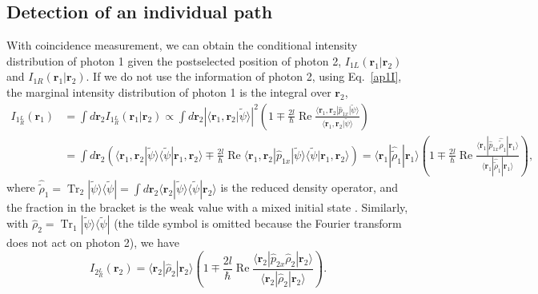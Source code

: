 \documentclass[pra,english,reprint,nofootinbib,aps,superscriptaddress,showpacs,showkeys]{revtex4-2}
\theoremstyle{definition}
\theoremstyle{remark}
\begin{document}
\begin{widetext}
		\section{Detection of an individual path}\label{appD}
		
		With coincidence measurement, we can obtain the conditional intensity distribution of photon 1 given the postselected position of photon 2, $I_{1L}(\mathbf{r}_1|\mathbf{r}_2)$ and $I_{1R}(\mathbf{r}_1|\mathbf{r}_2)$. If we do not use the information of photon 2, using Eq.~\eqref{ap1I}, the marginal intensity distribution of photon 1 is the integral over $\mathbf{r}_2$,
		\begin{align}
			I_{1{^L_R}}(\mathbf{r}_1)&=\int d\mathbf{r}_2 I_{1{^L_R}}(\mathbf{r}_1|\mathbf{r}_2)\propto\int d\mathbf{r}_2 \left|\langle\mathbf{r}_1,\mathbf{r}_2|\tilde{\psi}\rangle\right|^2\left(1\mp\frac{2l}{\hbar}\operatorname{Re}\frac{\langle\mathbf{r}_1,\mathbf{r}_2|\hat{p}_{1x}|\tilde{\psi}\rangle}{\langle\mathbf{r}_1,\mathbf{r}_2|\tilde{\psi}\rangle}\right)\nonumber\\
			&=\int d\mathbf{r}_2 \left(\langle\mathbf{r}_1,\mathbf{r}_2|\tilde{\psi}\rangle\langle\tilde{\psi}|\mathbf{r}_1,\mathbf{r}_2\rangle\mp\frac{2l}{\hbar}\operatorname{Re}\langle\mathbf{r}_1,\mathbf{r}_2|\hat{p}_{1x}|\tilde{\psi}\rangle\langle\tilde{\psi}|\mathbf{r}_1,\mathbf{r}_2\rangle\right)=\langle\mathbf{r}_1|\hat{\tilde{\rho}}_1|\mathbf{r}_1\rangle\left(1\mp\frac{2l}{\hbar}\operatorname{Re}\frac{\langle\mathbf{r}_1|\hat{p}_{1x}\hat{\tilde{\rho}}_1|\mathbf{r}_1\rangle}{\langle\mathbf{r}_1|\hat{\tilde{\rho}}_1|\mathbf{r}_1\rangle}\right),
		\end{align}
		where $\hat{\tilde{\rho}}_1=\operatorname{Tr}_2|\tilde{\psi}\rangle\langle\tilde{\psi}|=\int d\mathbf{r}_2\langle\mathbf{r}_2|\tilde{\psi}\rangle\langle\tilde{\psi}|\mathbf{r}_2\rangle$ is the reduced density operator, and the fraction in the bracket is the weak value with a mixed initial state \cite{wvmix}. Similarly, with $\hat{\rho}_2=\operatorname{Tr}_1|\tilde{\psi}\rangle\langle\tilde{\psi}|$ (the tilde symbol is omitted because the Fourier transform does not act on photon 2), we have
		\begin{equation}
			I_{2{^L_R}}(\mathbf{r}_2)=\langle\mathbf{r}_2|\hat{\rho}_2|\mathbf{r}_2\rangle\left(1\mp\frac{2l}{\hbar}\operatorname{Re}\frac{\langle\mathbf{r}_2|\hat{p}_{2x}\hat{\rho}_2|\mathbf{r}_2\rangle}{\langle\mathbf{r}_2|\hat{\rho}_2|\mathbf{r}_2\rangle}\right).
		\end{equation}
		

\end{widetext}
\end{document}
